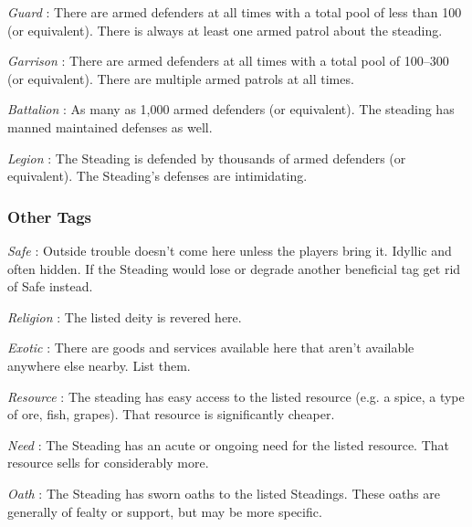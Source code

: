        

         {\em Guard} : There are armed defenders at all times with a total pool of less than 100 (or equivalent). There is always at least one armed patrol about the steading.

       

         {\em Garrison} : There are armed defenders at all times with a total pool of 100–300 (or equivalent). There are multiple armed patrols at all times.

       

         {\em Battalion} : As many as 1,000 armed defenders (or equivalent). The steading has manned maintained defenses as well.

       

         {\em Legion} : The Steading is defended by thousands of armed defenders (or equivalent). The Steading's defenses are intimidating.

       
\subsubsection{Other Tags}   
       

         {\em Safe} : Outside trouble doesn't come here unless the players bring it. Idyllic and often hidden. If the Steading would lose or degrade another beneficial tag get rid of Safe instead.

       

         {\em Religion} : The listed deity is revered here.

       

         {\em Exotic} : There are goods and services available here that aren't available anywhere else nearby. List them.

       

         {\em Resource} : The steading has easy access to the listed resource (e.g. a spice, a type of ore, fish, grapes). That resource is significantly cheaper.

       

         {\em Need} : The Steading has an acute or ongoing need for the listed resource. That resource sells for considerably more.

       

         {\em Oath} : The Steading has sworn oaths to the listed Steadings. These oaths are generally of fealty or support, but may be more specific.

       

